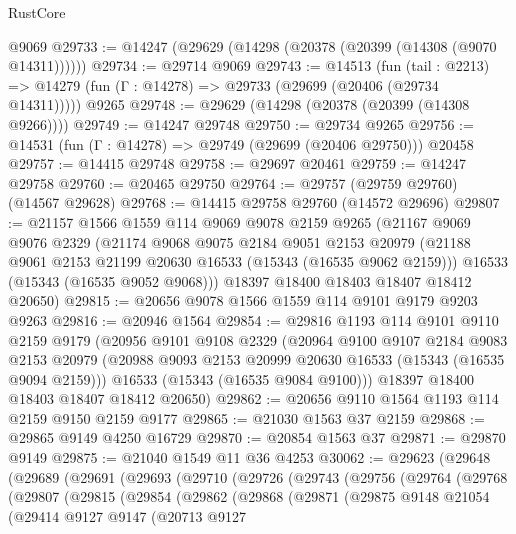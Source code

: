 \begin{lexlean}{RustCore}
\begin{coremodule}
    @9069
@29733 := @14247 (@29629 (@14298 (@20378 (@20399 (@14308 (@9070 @14311))))))
@29734 := @29714 @9069
@29743 := @14513
    (fun (tail : @2213) => @14279 (fun (Γ : @14278) => @29733 (@29699 (@20406 (@29734 @14311)))))
    @9265
@29748 := @29629 (@14298 (@20378 (@20399 (@14308 @9266))))
@29749 := @14247 @29748
@29750 := @29734 @9265
@29756 := @14531 (fun (Γ : @14278) => @29749 (@29699 (@20406 @29750))) @20458
@29757 := @14415 @29748
@29758 := @29697 @20461
@29759 := @14247 @29758
@29760 := @20465 @29750
@29764 := @29757 (@29759 @29760) (@14567 @29628)
@29768 := @14415 @29758 @29760 (@14572 @29696)
@29807 := @21157
    @1566
    @1559
    @114
    @9069
    @9078
    @2159
    @9265
    (@21167
      @9069
      @9076
      @2329
      (@21174
        @9068
        @9075
        @2184
        @9051
        @2153
        @20979
        (@21188 @9061 @2153 @21199 @20630 @16533 (@15343 (@16535 @9062 @2159)))
        @16533
        (@15343 (@16535 @9052 @9068)))
      @18397
      @18400
      @18403
      @18407
      @18412
      @20650)
@29815 := @20656 @9078 @1566 @1559 @114 @9101 @9179 @9203 @9263
@29816 := @20946 @1564
@29854 := @29816
    @1193
    @114
    @9101
    @9110
    @2159
    @9179
    (@20956
      @9101
      @9108
      @2329
      (@20964
        @9100
        @9107
        @2184
        @9083
        @2153
        @20979
        (@20988 @9093 @2153 @20999 @20630 @16533 (@15343 (@16535 @9094 @2159)))
        @16533
        (@15343 (@16535 @9084 @9100)))
      @18397
      @18400
      @18403
      @18407
      @18412
      @20650)
@29862 := @20656 @9110 @1564 @1193 @114 @2159 @9150 @2159 @9177
@29865 := @21030 @1563 @37 @2159
@29868 := @29865 @9149 @4250 @16729
@29870 := @20854 @1563 @37
@29871 := @29870 @9149
@29875 := @21040 @1549 @11 @36 @4253
@30062 := @29623
    (@29648
      (@29689
        (@29691
          (@29693
            (@29710
              (@29726
                (@29743
                  (@29756
                    (@29764
                      (@29768
                        (@29807
                          (@29815
                            (@29854
                              (@29862
                                (@29868
                                  (@29871
                                    (@29875
                                      @9148
                                      @21054
                                      (@29414
                                        @9127
                                        @9147
                                        (@20713
                                          @9127

\end{coremodule}
\end{lexlean}
